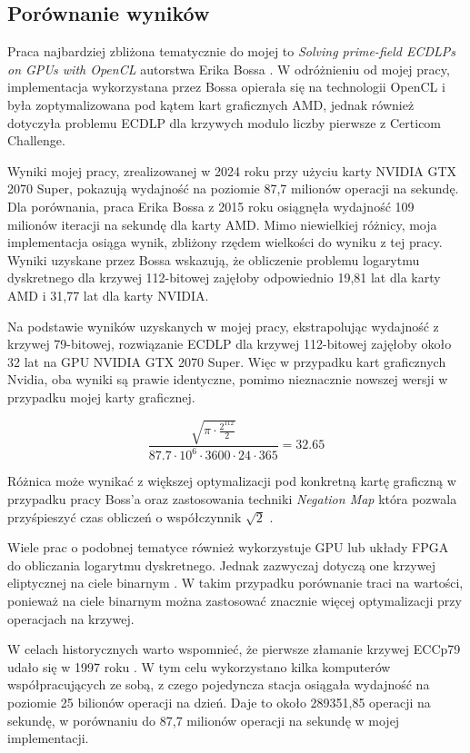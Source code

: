 \subsection{Porównanie wyników}
Praca najbardziej zbliżona tematycznie do mojej to \textit{Solving prime-field 
ECDLPs on GPUs with OpenCL} autorstwa Erika Bossa \cite{Boss2015}. W odróżnieniu 
od mojej pracy, implementacja wykorzystana przez Bossa opierała się na technologii 
OpenCL i była zoptymalizowana pod kątem kart graficznych AMD, jednak również 
dotyczyła problemu ECDLP dla krzywych modulo liczby pierwsze z Certicom Challenge.

Wyniki mojej pracy, zrealizowanej w 2024 roku przy użyciu karty NVIDIA GTX 2070 
Super, pokazują wydajność na poziomie 87,7 milionów operacji na sekundę. Dla 
porównania, praca Erika Bossa z 2015 roku osiągnęła wydajność 109 milionów iteracji 
na sekundę dla karty AMD.
Mimo niewielkiej różnicy, moja implementacja osiąga wynik, zbliżony rzędem wielkości do
wyniku z tej pracy.
Wyniki uzyskane przez Bossa wskazują, że obliczenie 
problemu logarytmu dyskretnego dla krzywej 112-bitowej zajęłoby odpowiednio 19,81 
lat dla karty AMD i 31,77 lat dla karty NVIDIA.

Na podstawie wyników uzyskanych w mojej pracy, ekstrapolując wydajność z krzywej 
79-bitowej, rozwiązanie ECDLP dla krzywej 112-bitowej zajęłoby około 32 lat na GPU 
NVIDIA GTX 2070 Super. Więc w przypadku kart graficznych Nvidia, oba wyniki są prawie identyczne,
pomimo nieznacznie nowszej wersji w przypadku mojej karty graficznej.

$$
\frac{\sqrt{\pi \cdot \frac{2^{112}}{2}}}{87.7 \cdot 10^{6} \cdot 3600 \cdot 24 \cdot 365} = 32.65
$$

Różnica może wynikać z większej optymalizacji pod konkretną kartę graficzną
w przypadku pracy Boss'a oraz zastosowania techniki \textit{Negation Map} która pozwala przyśpieszyć czas obliczeń
o współczynnik $\sqrt{2}$ \cite{Negation}.

Wiele prac o podobnej tematyce również wykorzystuje GPU lub układy FPGA do
obliczania logarytmu dyskretnego. Jednak zazwyczaj dotyczą one krzywej
eliptycznej na ciele binarnym \cite{Wenger2014,FPGA2008,Majkowski2008}. W
takim przypadku porównanie traci na wartości, ponieważ na ciele binarnym
można zastosować znacznie więcej optymalizacji przy operacjach na krzywej.

W celach historycznych warto wspomnieć, że pierwsze złamanie krzywej ECCp79
udało się w 1997 roku \cite{certicom-cracked}. W tym celu wykorzystano kilka komputerów
współpracujących ze sobą, z czego pojedyncza stacja osiągała wydajność na
poziomie 25 bilionów operacji na dzień. Daje to około 289351,85 operacji na
sekundę, w porównaniu do 87,7 milionów operacji na sekundę w mojej
implementacji.